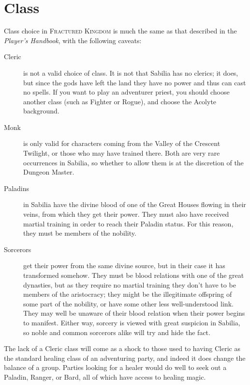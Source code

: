 \documentclass[10pt,twoside,openright,a4paper,twocolumn]{book}
\begin{document}
\section{Class}

Class choice in \textsc{Fractured Kingdom} is much the same as that described in
the \textit{Player's Handbook}, with the following caveats:

\begin{description}
\item [Cleric] is not a valid choice of class. It is not that Sabilia has no
clerics; it does, but since the gods have left the land they have no power and
thus can cast no spells.  If you want to play an adventurer priest, you should
choose another class (such as Fighter or Rogue), and choose the Acolyte
background.

\item [Monk] is only valid for characters coming from the Valley of the
Crescent Twilight, or those who may have trained there.  Both are very rare
occurrences in Sabilia, so whether to allow them is at the discretion of the
Dungeon Master.

\item [Paladins] in Sabilia have the divine blood of one of the Great Houses
flowing in their veins, from which they get their power.  They must also have
received martial training in order to reach their Paladin status.  For this
reason, they must be members of the nobility.

\item [Sorcerors] get their power from the same divine source, but in their
case it has transformed somehow.  They must be blood relations with one of the
great dynasties, but as they require no martial training they don't have to be
members of the aristocracy; they might be the illegitimate offspring of some
part of the nobility, or have some other less well-understood link.  They may
well be unaware of their blood relation when their power begins to manifest.
Either way, sorcery is viewed with great suspicion in Sabilia, so noble and
common sorcerors alike will try and hide the fact.
\end{description}

\noindent
The lack of a Cleric class will come as a shock to those used to having Cleric
as the standard healing class of an adventuring party, and indeed it does
change the balance of a group.  Parties looking for a healer would do well to seek
out a Paladin, Ranger, or Bard, all of which have access to healing magic.
\end{document}
